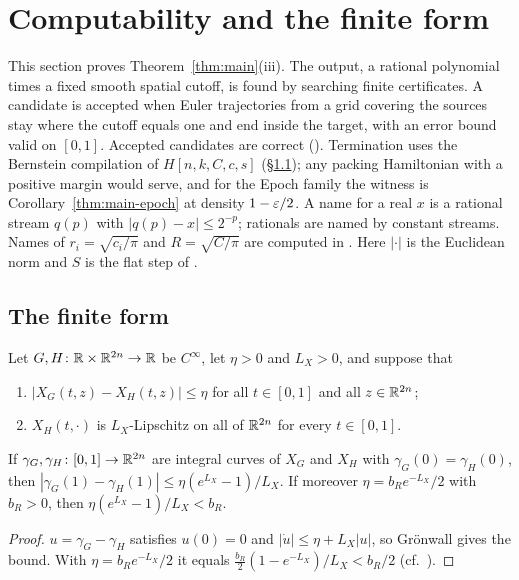 \section{Computability and the finite form}\label{sec:eff}

\begingroup\sloppy

This section proves Theorem~\ref{thm:main}(iii). The output, a rational polynomial times a fixed smooth spatial cutoff, is found by searching finite certificates. A candidate is accepted when Euler trajectories from a grid covering the sources stay where the cutoff equals one and end inside the target, with an error bound valid on $[0,1]$. Accepted candidates are correct (). Termination uses the Bernstein compilation of $H[n,k,C,c,s]$ (\S\ref{sec:eff-finite}); any packing Hamiltonian with a positive margin would serve, and for the Epoch family the witness is Corollary~\ref{thm:main-epoch} at density $1-\varepsilon/2$. A name for a real $x$ is a rational stream $q(p)$ with $|q(p)-x|\le2^{-p}$; rationals are named by constant streams. Names of $r_i=\sqrt{c_i/\pi}$ and $R=\sqrt{C/\pi}$ are computed in . Here $|\cdot|$ is the Euclidean norm and $S$ is the flat step of .

\subsection{The finite form}\label{sec:eff-finite}

\begin{lemma}[Gr\"onwall]\label{lem:eff-gronwall}
Let $G,H\colon\mathbb{R}\times\mathbb{R}^{2n}\to\mathbb{R}$ be $C^\infty$, let $\eta>0$ and $L_X>0$, and suppose that
\begin{enumerate}[label=(\roman*)]
\item $|X_G(t,z)-X_H(t,z)|\le\eta$ for all $t\in[0,1]$ and all $z\in\mathbb{R}^{2n}$;
\item $X_H(t,\cdot)$ is $L_X$-Lipschitz on all of $\mathbb{R}^{2n}$ for every $t\in[0,1]$.
\end{enumerate}
If $\gamma_G,\gamma_H\colon[0,1]\to\mathbb{R}^{2n}$ are integral curves of $X_G$ and $X_H$ with
$\gamma_G(0)=\gamma_H(0)$, then $|\gamma_G(1)-\gamma_H(1)|\le\eta(e^{L_X}-1)/L_X$. If moreover
$\eta=b_Re^{-L_X}/2$ with $b_R>0$, then $\eta(e^{L_X}-1)/L_X<b_R$.
\end{lemma}

\begin{proof}
$u=\gamma_G-\gamma_H$ satisfies $u(0)=0$ and $|\dot u|\le\eta+L_X|u|$, so Gr\"onwall gives the bound. With $\eta=b_Re^{-L_X}/2$ it equals $\tfrac{b_R}2(1-e^{-L_X})/L_X<b_R/2$ (cf.\ ).
\end{proof}

